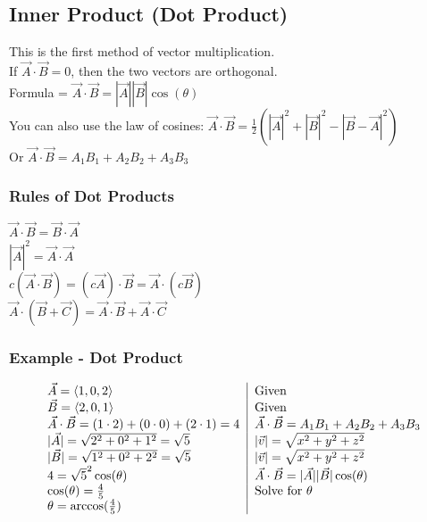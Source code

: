 \documentclass{article}
\begin{document}
    \subsection{Inner Product (Dot Product)}
    This is the first method of vector multiplication.\\
    If $\vec{A} \cdot \vec{B} = 0$, then the two vectors are orthogonal.\\
    Formula = $\vec{A} \cdot \vec{B} = |\vec{A}||\vec{B}|\cos(\theta)$\\
    You can also use the law of cosines:
    $\vec{A} \cdot \vec{B} = \frac{1}{2}(|\vec{A}|^2+|\vec{B}|^2-|\vec{B}-\vec{A}|^2)$\\
    Or $\vec{A} \cdot \vec{B} = A_1B_1+A_2B_2+A_3B_3$

        \subsubsection{Rules of Dot Products}
        $\vec{A} \cdot \vec{B} = \vec{B} \cdot \vec{A}$\\
        $|\vec{A}|^2 = \vec{A} \cdot \vec{A}$\\
        $c(\vec{A} \cdot \vec{B}) = (c\vec{A}) \cdot \vec{B} = \vec{A} \cdot (c\vec{B})$\\
        $\vec{A} \cdot (\vec{B} + \vec{C}) = \vec{A} \cdot \vec{B} + \vec{A} \cdot \vec{C}$

        \subsubsection{Example - Dot Product}
        \[
        \begin{aligned}
        \begin{tabular}{l | l}
        $\vec{A} = \langle 1,0,2 \rangle$ & Given\\
        $\vec{B} = \langle 2,0,1 \rangle$ & Given\\
        $\vec{A} \cdot \vec{B} = (1 \cdot 2) + (0 \cdot 0) + (2 \cdot 1) = 4$ & $\vec{A} \cdot \vec{B} = A_1B_1+A_2B_2+A_3B_3$\\
        $|\vec{A}| = \sqrt{2^2 + 0^2 + 1^2} = \sqrt{5}$ & $|\vec{v}|=\sqrt{x^2+y^2+z^2}$\\
        $|\vec{B}| = \sqrt{1^2 + 0^2 + 2^2} = \sqrt{5}$ & $|\vec{v}|=\sqrt{x^2+y^2+z^2}$\\
        $4 = \sqrt{5}^2 \cos(\theta)$ & $\vec{A} \cdot \vec{B} = |\vec{A}||\vec{B}|\cos(\theta)$\\
        $\cos(\theta) = \frac{4}{5}$ & Solve for $\theta$\\
        $\theta = \arccos(\frac{4}{5})$ & \\
        \end{tabular}
        \end{aligned}
        \]
\end{document}

